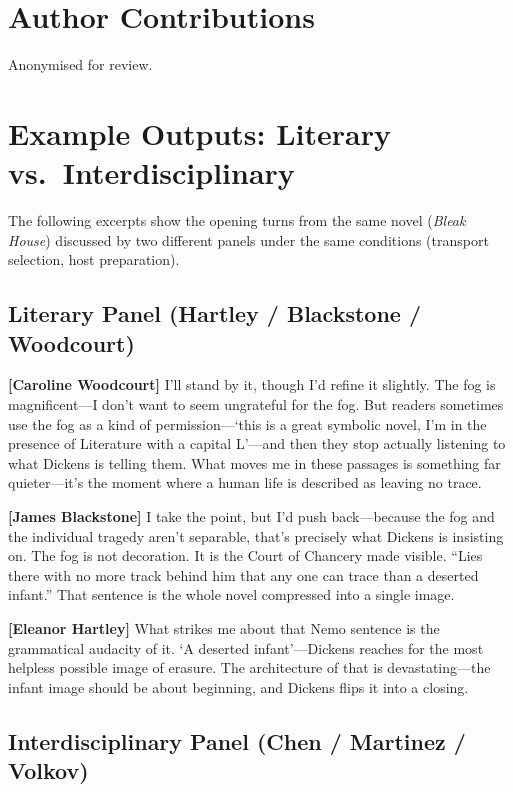 \documentclass[letterpaper]{article}
\begin{document}
\section{Author Contributions}
Anonymised for review.




\newpage
\appendix
\section{Example Outputs: Literary vs.\ Interdisciplinary}

The following excerpts show the opening turns from the same novel
(\emph{Bleak House}) discussed by two different panels under the
same conditions (transport selection, host preparation).

\subsection{Literary Panel (Hartley / Blackstone / Woodcourt)}

\noindent\textbf{[Caroline Woodcourt]}
I'll stand by it, though I'd refine it slightly.  The fog is
magnificent---I don't want to seem ungrateful for the fog.  But
readers sometimes use the fog as a kind of permission---`this is a
great symbolic novel, I'm in the presence of Literature with a capital
L'---and then they stop actually listening to what Dickens is telling
them.  What moves me in these passages is something far quieter---it's
the moment where a human life is described as leaving no trace.

\noindent\textbf{[James Blackstone]}
I take the point, but I'd push back---because the fog and the
individual tragedy aren't separable, that's precisely what Dickens is
insisting on.  The fog is not decoration.  It is the Court of Chancery
made visible.  ``Lies there with no more track behind him that any one
can trace than a deserted infant.''  That sentence is the whole novel
compressed into a single image.

\noindent\textbf{[Eleanor Hartley]}
What strikes me about that Nemo sentence is the grammatical audacity
of it.  `A deserted infant'---Dickens reaches for the most helpless
possible image of erasure.  The architecture of that is
devastating---the infant image should be about beginning, and Dickens
flips it into a closing.

\subsection{Interdisciplinary Panel (Chen / Martinez / Volkov)}
\end{document}
